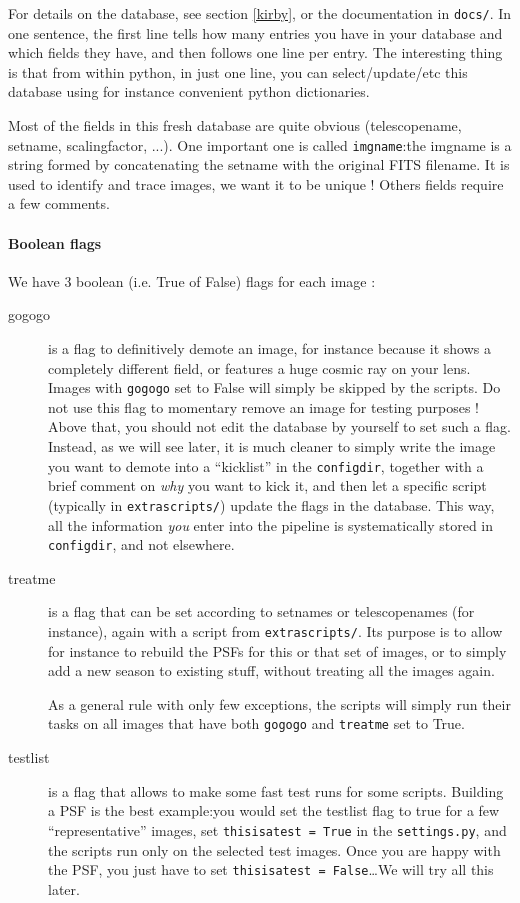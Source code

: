 For details on the database, see section \ref{kirby}, or the documentation in \verb+docs/+. In one sentence, the first line tells how many entries you have in your database and which fields they have, and then follows one line per entry. The interesting thing is that from within python, in just one line, you can select/update/etc this database using for instance convenient python dictionaries.

Most of the fields in this fresh database are quite obvious (telescopename, setname, scalingfactor, ...). One important one is called \verb+imgname+:the imgname is a string formed by concatenating the setname with the original FITS filename. It is used to identify and trace images, we want it to be unique !
Others fields require a few comments.

\paragraph{Boolean flags}

We have 3 boolean (i.e. True of False) flags for each image :

\begin{description}

\item[gogogo] is a flag to definitively demote an image, for instance because it shows a completely different field, or features a huge cosmic ray on your lens. Images with \verb+gogogo+ set to False will simply be skipped by the scripts. Do not use this flag to momentary remove an image for testing purposes ! Above that, you should not edit the database by yourself to set such a flag. Instead, as we will see later, it is much cleaner to simply write the image you want to demote into a ``kicklist'' in the \verb+configdir+, together with a brief comment on \emph{why} you want to kick it, and then let a specific script (typically in \verb+extrascripts/+) update the flags in the database. This way, all the information \emph{you} enter into the pipeline is systematically stored in \verb+configdir+, and not elsewhere.

\item[treatme] is a flag that can be set according to setnames or telescopenames (for instance), again with a script from \verb+extrascripts/+. Its purpose is to allow for instance to rebuild the PSFs for this or that set of images, or to simply add a new season to existing stuff, without treating all the images again.

As a general rule with only few exceptions, the scripts will simply run their tasks on all images that have both \verb+gogogo+ and \verb+treatme+ set to True.

\item[testlist] is a flag that allows to make some fast test runs for some scripts. Building a PSF is the best example:you would set the testlist flag to true for a few ``representative'' images, set \verb+thisisatest = True+ in the \verb+settings.py+, and the scripts run only on the selected test images. Once you are happy with the PSF, you just have to set  \verb+thisisatest = False+\ldots We will try all this later.

\end{description}

